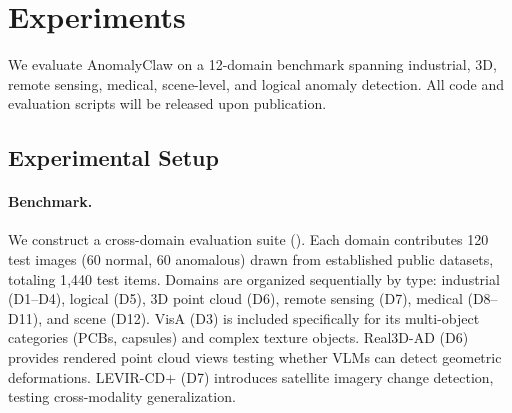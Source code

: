 \section{Experiments}
\label{sec:experiments}

We evaluate AnomalyClaw on a 12-domain benchmark spanning industrial, 3D, remote sensing, medical, scene-level, and logical anomaly detection.
All code and evaluation scripts will be released upon publication.

\subsection{Experimental Setup}
\label{sec:setup}

\paragraph{Benchmark.}
We construct a cross-domain evaluation suite ().
Each domain contributes 120 test images (60 normal, 60 anomalous) drawn from established public datasets, totaling 1{,}440 test items.
Domains are organized sequentially by type: industrial (D1--D4), logical (D5), 3D point cloud (D6), remote sensing (D7), medical (D8--D11), and scene (D12).
VisA (D3) is included specifically for its multi-object categories (PCBs, capsules) and complex texture objects.
Real3D-AD (D6) provides rendered point cloud views testing whether VLMs can detect geometric deformations.
LEVIR-CD+ (D7) introduces satellite imagery change detection, testing cross-modality generalization.

